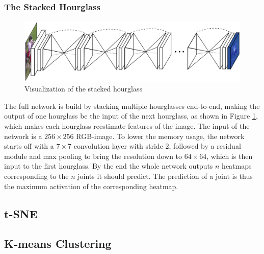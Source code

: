 \documentclass[./main.tex]{subfiles}
\begin{document}
\subsubsection{The Stacked Hourglass}
\begin{figure}[h]
    \centering
    \includegraphics[height = 4 cm]{entities/SHG.png}
    \caption{Visualization of the stacked hourglass \cite{Newell}}
    \label{fig:SHG}
\end{figure}
\noindent The full network is build by stacking multiple hourglasses end-to-end, making the output of one hourglass be the input of the next hourglass, as shown in Figure \ref{fig:SHG}, which makes each hourglass reestimate features of the image. The input of the network is a $256 \times 256$ RGB-image. To lower the memory usage, the network starts off with a $7 \times 7$ convolution layer with stride 2, followed by a residual module and max pooling to bring the resolution down to $64 \times 64$, which is then input to the first hourglass.
By the end the whole network outputs $n$ heatmaps corresponding to the $n$ joints it should predict. The prediction of a joint is thus the maximum activation of the corresponding heatmap.

\subsection{t-SNE}
\subsection{K-means Clustering}
\end{document}
